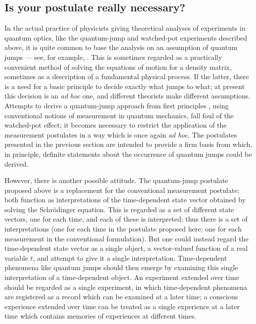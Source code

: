 \documentclass[12pt,a4paper,reqno]{article}
\renewcommand{\(}{\left(}
\renewcommand{\)}{\right)}
\newcommand{\<}{\langle}
\renewcommand{\>}{\rangle}
\theoremstyle{plain} %
\theoremstyle{definition}
\theoremstyle{remark}
\begin{document}
\subsection{Is your postulate really necessary?}

In the actual practice of physicists giving theoretical analyses of
experiments in quantum optics, like the quantum-jump and watched-pot
experiments described above, it is quite common to base the analysis on
an assumption of quantum jumps --- see, for example, \cite{Carmichael,
Dalibard:MonteCarlo, Hegerfeldt, PlenioKnight, Almut:qjumps, WisemanToombes}. This is
sometimes regarded as a practically convenient method of solving the
equations of motion for a density matrix, sometimes as a description of
a fundamental physical process. If the latter, there is a need for a
basic principle to decide exactly what jumps to what; at present
\cite{WisemanToombes} this decision is an \emph{ad hoc} one, and
different theorists make different assumptions. Attempts to derive a
quantum-jump approach from first principles \cite{Hegerfeldt,
PlenioKnight}, using conventional notions of measurement in quantum
mechanics, fall foul of the watched-pot effect; it becomes necessary to
restrict the application of the measurement postulates in a way which is
once again \emph{ad hoc}. The postulates presented in the previous
section are intended to provide a firm basis from which, in
principle, definite statements about the occurrence of quantum jumps
could be derived.

However, there is another possible attitude. The quantum-jump postulate 
proposed above is a replacement for the conventional measurement
postulate; both function as interpretations of the time-dependent state
vector obtained by solving the Schr\"odinger equation. This is regarded
as a set of different state vectors, one for each time, and each of
these is interpreted; thus there is a set of interpretations (one for
each time in the postulate proposed here; one for each measurement in
the conventional formulation). But one could instead regard the
time-dependent state vector as a single object, a vector-valued function
of a real variable $t$, and attempt to give it a single interpretation.
Time-dependent phenomena like quantum jumps should then emerge by
examining this single interpretation of a time-dependent object.
An experiment extended over time should be regarded as a single
experiment, in which time-dependent phenomena are registered as a record
which can be examined at a later time; a conscious experience extended
over time can be treated as a single experience at a later time which
contains memories of experiences at different times.
\end{document}

